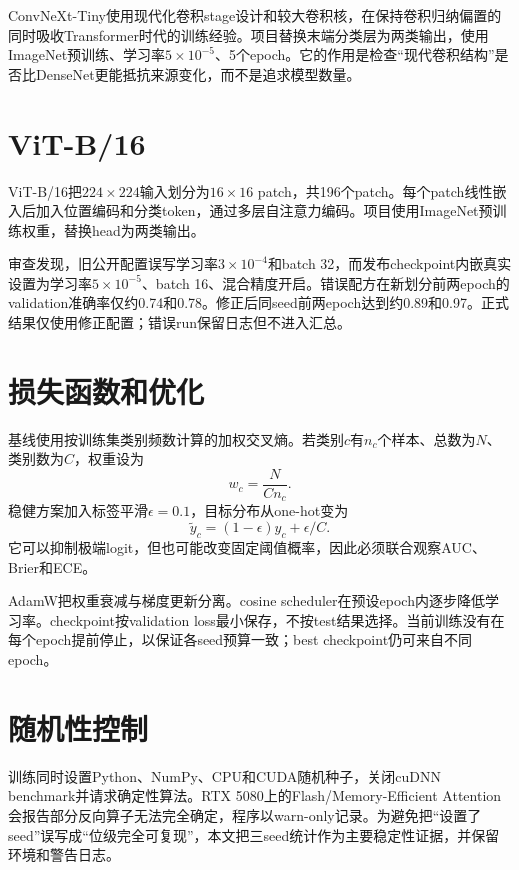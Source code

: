 ConvNeXt-Tiny使用现代化卷积stage设计和较大卷积核，在保持卷积归纳偏置的同时吸收Transformer时代的训练经验。项目替换末端分类层为两类输出，使用ImageNet预训练、学习率$5\times10^{-5}$、5个epoch。它的作用是检查“现代卷积结构”是否比DenseNet更能抵抗来源变化，而不是追求模型数量。

\section{ViT-B/16}

ViT-B/16把$224\times224$输入划分为$16\times16$ patch，共196个patch。每个patch线性嵌入后加入位置编码和分类token，通过多层自注意力编码。项目使用ImageNet预训练权重，替换head为两类输出。

审查发现，旧公开配置误写学习率$3\times10^{-4}$和batch 32，而发布checkpoint内嵌真实设置为学习率$5\times10^{-5}$、batch 16、混合精度开启。错误配方在新划分前两epoch的validation准确率仅约0.74和0.78。修正后同seed前两epoch达到约0.89和0.97。正式结果仅使用修正配置；错误run保留日志但不进入汇总。

\section{损失函数和优化}

基线使用按训练集类别频数计算的加权交叉熵。若类别$c$有$n_c$个样本、总数为$N$、类别数为$C$，权重设为
\begin{equation}
w_c=\frac{N}{Cn_c}.
\end{equation}
稳健方案加入标签平滑$\epsilon=0.1$，目标分布从one-hot变为
\begin{equation}
\tilde y_c=(1-\epsilon)y_c+\epsilon/C.
\end{equation}
它可以抑制极端logit，但也可能改变固定阈值概率，因此必须联合观察AUC、Brier和ECE。

AdamW把权重衰减与梯度更新分离。cosine scheduler在预设epoch内逐步降低学习率。checkpoint按validation loss最小保存，不按test结果选择。当前训练没有在每个epoch提前停止，以保证各seed预算一致；best checkpoint仍可来自不同epoch。

\section{随机性控制}

训练同时设置Python、NumPy、CPU和CUDA随机种子，关闭cuDNN benchmark并请求确定性算法。RTX 5080上的Flash/Memory-Efficient Attention会报告部分反向算子无法完全确定，程序以warn-only记录。为避免把“设置了seed”误写成“位级完全可复现”，本文把三seed统计作为主要稳定性证据，并保留环境和警告日志。

